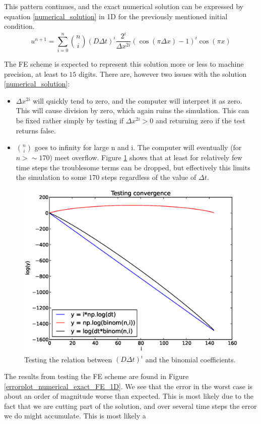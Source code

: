 This pattern continues, and the exact numerical solution can be expressed by equation \eqref{numerical_solution} in 1D for the previously mentioned initial condition.
\begin{equation}\label{numerical_solution}
  u^{n+1} = \sum\limits_{i=0}^n {n\choose i}\left(D\Delta t\right)^i\frac{2^i}{\Delta x^{2i}}\left(\cos(\pi\Delta x)-1\right)^i\cos(\pi x)
\end{equation}

The FE scheme is expected to represent this solution more or less to machine precision, at least to $15$ digits. 
There are, however two issues with the solution \eqref{numerical_solution}:
\begin{itemize}
 \item $\Delta x^{2i}$ will quickly tend to zero, and the computer will interpret it as zero. This will cause division by zero, which again ruins the simulation. This can be fixed rather simply by testing if $\Delta x^{2i}>0$ and returning zero if the test returns false.
 \item ${n\choose i}$ goes to infinity for large n and i. The computer will eventually (for $n>\sim170$) meet overflow. Figure \ref{convergence_exact_numerical_1d_n145} shows that at least for relatively few time steps the troublesome terms can be dropped, but effectively this limits the simulation to some 170 steps regardless of the value of $\Delta t$.
\end{itemize}

\begin{figure}[H]
 \centering
 \includegraphics[scale=0.7]{Figures/convergence_exact_numerical_1d_n145}
 \caption{Testing the relation between $\left(D\Delta t\right)^i$ and the binomial coefficients.}
 \label{convergence_exact_numerical_1d_n145}
\end{figure}
The results from testing the FE scheme are found in Figure \ref{errorplot_numerical_exact_FE_1D}. We see that the error in the worst case is about an order of magnitude worse than expected. This is most likely due to the fact that we are cutting part of the solution, and over several time steps the error we do might accumulate.
This is most likely a 

